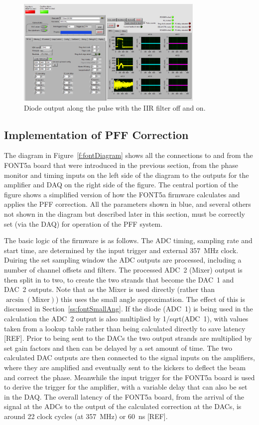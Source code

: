 \begin{figure}
  \centering
  \includegraphics[width=0.8\textwidth]{Figures/commissioning/DAQScreenshot}
  \caption{Diode output along the pulse with the IIR filter off and on.}
  \label{f:DAQScreenshot}
\end{figure}

\subsection{Implementation of PFF Correction}
\label{ss:pffFirmware}

The diagram in Figure~\ref{f:fontDiagram} shows all the connections to and from the FONT5a board that were introduced in the previous section, from the phase monitor and timing inputs on the left side of the diagram to the outputs for the amplifier and DAQ on the right side of the figure. The central portion of the figure shows a simplified version of how the FONT5a firmware calculates and applies the PFF correction. All the parameters shown in blue, and several others not shown in the diagram but described later in this section, must be correctly set (via the DAQ) for operation of the PFF system.

The basic logic of the firmware is as follows. The ADC timing, sampling rate and start time, are determined by the input trigger and external 357~MHz clock. Duiring the set sampling window the ADC outputs are processed, including a number of channel offsets and filters. The processed ADC~2 (Mixer) output is then split in to two, to create the two strands that become the DAC~1 and DAC~2 outputs. Note that as the Mixer is used directly (rather than \(\arcsin(\mathrm{Mixer})\)) this uses the small angle approximation. The effect of this is discussed in Section~\ref{ss:fontSmallAng}. If the diode (ADC~1) is being used in the calculation the ADC~2 output is also multiplied by 1/sqrt(ADC~1), with values taken from a lookup table rather than being calculated directly to save latency [REF]. Prior to being sent to the DACs the two output strands are multiplied by set gain factors and then can be delayed by a set amount of time. The two calculated DAC outputs are then connected to the signal inputs on the amplifiers, where they are amplified and eventually sent to the kickers to deflect the beam and correct the phase. Meanwhile the input trigger for the FONT5a board is used to derive the trigger for the amplifier, with a variable delay that can also be set in the DAQ. The overall latency of the FONT5a board, from the arrival of the signal at the ADCs to the output of the calculated correction at the DACs, is around 22 clock cycles (at 357~MHz) or 60~ns [REF].

